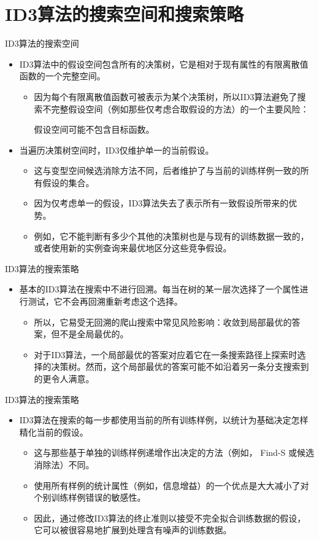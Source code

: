 \documentclass[presentation]{beamer}
\begin{document}
\section{ID3算法的搜索空间和搜索策略}
\label{sec:org4918f0b}
\begin{frame}[label={sec:org9382bf8}]{ID3算法的搜索空间}
\begin{itemize}
\item ID3算法中的假设空间包含所有的决策树，它是相对于现有属性的有限离散值函数的一个完整空间。
\begin{itemize}
\item 因为每个有限离散值函数可被表示为某个决策树，所以ID3算法避免了搜索不完整假设空间（例如那些仅考虑合取假设的方法）的一个主要风险：

假设空间可能不包含目标函数。
\end{itemize}
\item 当遍历决策树空间时，ID3仅维护单一的当前假设。
\begin{itemize}
\item 这与变型空间候选消除方法不同，后者维护了与当前的训练样例一致的所有假设的集合。
\item 因为仅考虑单一的假设，ID3算法失去了表示所有一致假设所带来的优势。
\item 例如，它不能判断有多少个其他的决策树也是与现有的训练数据一致的，或者使用新的实例查询来最优地区分这些竞争假设。
\end{itemize}
\end{itemize}
\end{frame}
\begin{frame}[label={sec:org171c921}]{ID3算法的搜索策略}
\begin{itemize}
\item 基本的ID3算法在搜索中不进行回溯。每当在树的某一层次选择了一个属性进行测试，它不会再回溯重新考虑这个选择。
\begin{itemize}
\item 所以，它易受无回溯的爬山搜索中常见风险影响：收敛到局部最优的答案，但不是全局最优的。
\item 对于ID3算法，一个局部最优的答案对应着它在一条搜索路径上探索时选择的决策树。然而，这个局部最优的答案可能不如沿着另一条分支搜索到的更令人满意。
\end{itemize}
\end{itemize}
\end{frame}
\begin{frame}[label={sec:orgd41b073}]{ID3算法的搜索策略}
\begin{itemize}
\item ID3算法在搜索的每一步都使用当前的所有训练样例，以统计为基础决定怎样精化当前的假设。
\begin{itemize}
\item 这与那些基于单独的训练样例递增作出决定的方法（例如， Find-S 或候选消除法）不同。
\item 使用所有样例的统计属性（例如，信息增益）的一个优点是大大减小了对个别训练样例错误的敏感性。
\item 因此，通过修改ID3算法的终止准则以接受不完全拟合训练数据的假设，它可以被很容易地扩展到处理含有噪声的训练数据。
\end{itemize}
\end{itemize}
\end{frame}
\end{document}
